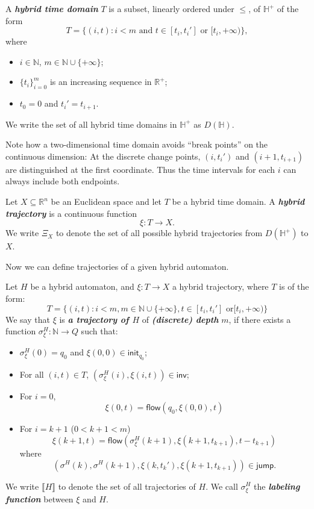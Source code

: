 \documentclass[envcountsect]{llncs}
\newcommand{\flow}{\mathsf{flow}}
\newcommand{\jump}{\mathsf{jump}}
\newcommand{\inv}{\mathsf{inv}}
\newcommand{\init}{\mathsf{init}}
\begin{document}
\begin{definition}
A {\bf\em hybrid time domain} $T$ is a subset, linearly ordered under $\leq$, of
 $\mathbb{H}^+$ of the form
$$T=\{(i, t): i<m \mbox{ and } t\in [t_i, t_i']\mbox{ or }[t_i, +\infty)\},$$ 
where%
\begin{itemize}
 \item $i\in \mathbb{N}$, $m\in \mathbb{N}\cup\{+\infty\}$; 
  \item $\{t_i\}_{i=0}^m$ is an increasing sequence in $\mathbb{R}^+$; 
 \item $t_0= 0$ and $t_i'=t_{i+1}$.
 \end{itemize} 
We write the set of all hybrid time domains in $\mathbb{H}^+$ as $D(\mathbb{H})$.
\end{definition}

\begin{remark}
Note how a two-dimensional time domain avoids ``break points'' on the continuous
 dimension: At the discrete change points, $(i,t_i')$ and $(i+1, t_{i+1})$ are
distinguished at the first coordinate. Thus the time intervals for each $i$ can
always include both endpoints. 
\end{remark}


\begin{definition}
 Let $X\subseteq\mathbb{R}^n$ be an Euclidean space and let $T$ be a hybrid 
time domain. A {\bf\em hybrid trajectory} is a continuous function 
$$\xi: T \rightarrow X.$$
We write $\Xi_X$ to denote the set of all possible hybrid trajectories from 
$D(\mathbb{H}^+)$ to $X$. 
 \end{definition}

Now we can define trajectories of a given hybrid automaton. 

\begin{definition}\label{trajec}
Let $H$ be a hybrid automaton, and $\xi: T\rightarrow X$ a hybrid trajectory, 
where $T$ is of the form:
$$T = \{(i,t): i< m, m\in \mathbb{N}\cup\{+\infty\}, t\in [t_i, t_i'] \mbox{ or
} [t_i, +\infty) \}$$
We say that $\xi$ is {\bf\em a trajectory of $H$} of {\bf\em (discrete) depth} 
$m$, if there exists a function $\sigma^H_{\xi}: \mathbb{N}\rightarrow Q$ such
that:
\begin{itemize}
\item $\sigma^H_{\xi}(0) = q_0$ and $\xi(0,0)\in \init_{q_0}$;
\item For all $(i, t)\in T$, $(\sigma^H_{\xi}(i), \xi(i,t))\in \inv$;
\item For $i=0$,
$$\xi(0,t) = \flow(q_0, \xi(0,0), t)$$ 
\item For $i = k+1$ ($0< k+1<m$)
$$\xi(k+1, t) = \flow( \sigma^H_{\xi}(k+1), \xi(k+1, t_{k+1}), t - t_{k+1})$$
where 
$$(\sigma^H(k), \sigma^H(k+1), \xi(k, t_k'), \xi(k+1,t_{k+1}))\in \jump.$$ 
\end{itemize}
We write $\llbracket H\rrbracket$ to denote the set of all trajectories of $H$. 
We call $\sigma^H_{\xi}$ the {\bf\em labeling function} between $\xi$ and $H$.
\end{definition}
\end{document}
